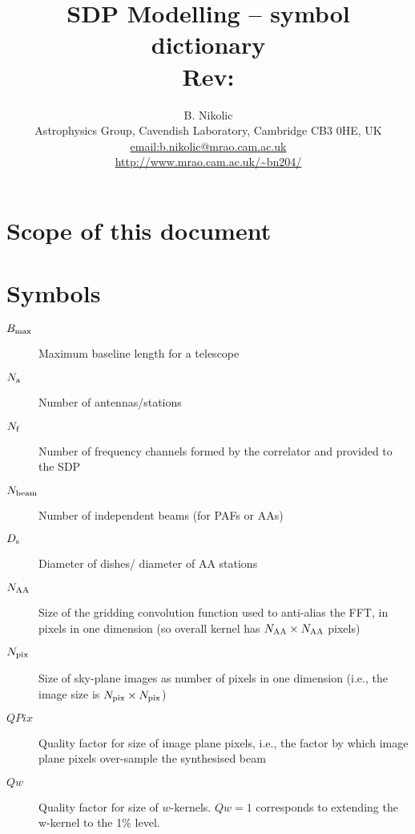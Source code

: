 \documentclass[useAMS,usenatbib,referee]{article}
\title{SDP Modelling -- symbol dictionary\\
  Rev: }
\author{B. Nikolic\\
  Astrophysics Group, Cavendish Laboratory, Cambridge CB3 0HE, UK
  \\\url{email:b.nikolic@mrao.cam.ac.uk}
 \\\url{http://www.mrao.cam.ac.uk/~bn204/}}
\begin{document}
\maketitle

\tableofcontents

\section{Scope of this document}

\section{Symbols}

\begin{description}
  \item[$B_{\rm max}$] Maximum baseline length for a telescope
  \item[$N_{\rm a}$] Number of antennas/stations
  \item[$N_{\rm f}$] Number of frequency channels formed by the
    correlator and provided to the SDP
  \item[$N_{\rm beam}$] Number of independent beams (for PAFs or AAs)
  \item[$D_{\rm s}$] Diameter of dishes/ diameter of AA stations
  \item[$N_{\rm AA}$] Size of the gridding convolution function used
    to anti-alias the FFT, in pixels in one dimension (so overall
    kernel has $N_{\rm AA} \times N_{\rm AA}$ pixels)

  \item[$N_{\rm pix}$] Size of sky-plane images as number of pixels in
    one dimension (i.e., the image size is $N_{\rm pix} \times N_{\rm
      pix} $)

  \item[$QPix$] Quality factor for size of image plane pixels, i.e.,
    the factor by which image plane pixels over-sample the synthesised
    beam

  \item[$Qw$] Quality factor for size of $w$-kernels. $Qw=1$
    corresponds to extending the w-kernel to the 1\% level. 

\end{description}
\end{document}
